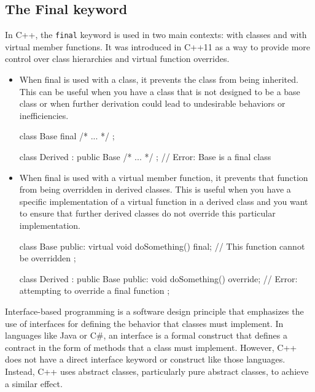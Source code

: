\documentclass{report}
\begin{document}
    \subsection{The Final keyword}
    \bigbreak \noindent 
    \begin{concept}
        In C++, the \texttt{final} keyword is used in two main contexts: with classes and with virtual member functions. It was introduced in C++11 as a way to provide more control over class hierarchies and virtual function overrides.
        \begin{itemize}
            \item When final is used with a class, it prevents the class from being inherited. This can be useful when you have a class that is not designed to be a base class or when further derivation could lead to undesirable behaviors or inefficiencies.
                \bigbreak \noindent 
                \begin{cppcode}
                class Base final { /* ... */ };

                class Derived : public Base { /* ... */ }; // Error: Base is a final class
                \end{cppcode}
            \item When final is used with a virtual member function, it prevents that function from being overridden in derived classes. This is useful when you have a specific implementation of a virtual function in a derived class and you want to ensure that further derived classes do not override this particular implementation.
                \bigbreak \noindent 
                \begin{cppcode}
                class Base {
                public:
                    virtual void doSomething() final; // This function cannot be overridden
                };

                class Derived : public Base {
                public:
                    void doSomething() override; // Error: attempting to override a final function
                };
                \end{cppcode}
        \end{itemize}
    \end{concept}


    \pagebreak
    \bigbreak \noindent 
    \begin{concept}
        Interface-based programming is a software design principle that emphasizes the use of interfaces for defining the behavior that classes must implement. In languages like Java or C\#, an interface is a formal construct that defines a contract in the form of methods that a class must implement. However, C++ does not have a direct interface keyword or construct like those languages. Instead, C++ uses abstract classes, particularly pure abstract classes, to achieve a similar effect. 
    \end{concept}
\end{document}
